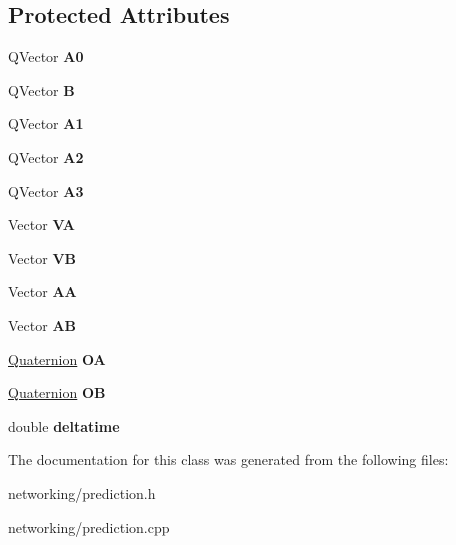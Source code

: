 \subsection*{Protected Attributes}
\begin{DoxyCompactItemize}
\item 
Q\+Vector {\bfseries A0}\hypertarget{classPrediction_a45d4c0964d2300d29c5f0a133b826e8d}{}\label{classPrediction_a45d4c0964d2300d29c5f0a133b826e8d}

\item 
Q\+Vector {\bfseries B}\hypertarget{classPrediction_a7a8e2c4c2290691b8a36fa1981884a1f}{}\label{classPrediction_a7a8e2c4c2290691b8a36fa1981884a1f}

\item 
Q\+Vector {\bfseries A1}\hypertarget{classPrediction_aaab2e69aa726045a242f605e3cb7d854}{}\label{classPrediction_aaab2e69aa726045a242f605e3cb7d854}

\item 
Q\+Vector {\bfseries A2}\hypertarget{classPrediction_a3a2802f20d760acb45a8342b92fd37f4}{}\label{classPrediction_a3a2802f20d760acb45a8342b92fd37f4}

\item 
Q\+Vector {\bfseries A3}\hypertarget{classPrediction_a41ad16fefaf88dc0133df44e55236fc4}{}\label{classPrediction_a41ad16fefaf88dc0133df44e55236fc4}

\item 
Vector {\bfseries VA}\hypertarget{classPrediction_ad6304ea0f45e6122b346e386217b0f82}{}\label{classPrediction_ad6304ea0f45e6122b346e386217b0f82}

\item 
Vector {\bfseries VB}\hypertarget{classPrediction_aa4f6a97f273b7c668f11dc4a87c3f8c5}{}\label{classPrediction_aa4f6a97f273b7c668f11dc4a87c3f8c5}

\item 
Vector {\bfseries AA}\hypertarget{classPrediction_a866d0c142dafcc97caa6c51252ee4366}{}\label{classPrediction_a866d0c142dafcc97caa6c51252ee4366}

\item 
Vector {\bfseries AB}\hypertarget{classPrediction_a967d6c10e4f60ab27f504d1d8acc005c}{}\label{classPrediction_a967d6c10e4f60ab27f504d1d8acc005c}

\item 
\hyperlink{structQuaternion}{Quaternion} {\bfseries OA}\hypertarget{classPrediction_a92b2f0be75200deddf254991823d5a21}{}\label{classPrediction_a92b2f0be75200deddf254991823d5a21}

\item 
\hyperlink{structQuaternion}{Quaternion} {\bfseries OB}\hypertarget{classPrediction_abef39ee42e5a2801f9bf03a40f8b1768}{}\label{classPrediction_abef39ee42e5a2801f9bf03a40f8b1768}

\item 
double {\bfseries deltatime}\hypertarget{classPrediction_a992db76c4e65e6b3dfbefe18213e340a}{}\label{classPrediction_a992db76c4e65e6b3dfbefe18213e340a}

\end{DoxyCompactItemize}


The documentation for this class was generated from the following files\+:\begin{DoxyCompactItemize}
\item 
networking/prediction.\+h\item 
networking/prediction.\+cpp\end{DoxyCompactItemize}
